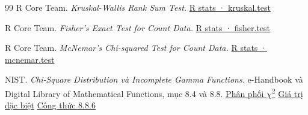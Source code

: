\documentclass[11pt,a4paper]{article}
\begin{document}
\begin{thebibliography}{99}
  R Core Team. \emph{Kruskal-Wallis Rank Sum Test.}
  \href{https://stat.ethz.ch/R-manual/R-devel/library/stats/html/kruskal.test.html}{R stats · kruskal.test}

  R Core Team. \emph{Fisher’s Exact Test for Count Data.}
  \href{https://stat.ethz.ch/R-manual/R-devel/library/stats/html/fisher.test.html}{R stats · fisher.test}

  R Core Team. \emph{McNemar’s Chi-squared Test for Count Data.}
  \href{https://stat.ethz.ch/R-manual/R-devel/library/stats/html/mcnemar.test.html}{R stats · mcnemar.test}

  NIST. \emph{Chi-Square Distribution và Incomplete Gamma Functions.} e-Handbook và Digital Library of Mathematical Functions, mục 8.4 và 8.8.
  \href{https://www.itl.nist.gov/div898/handbook/eda/section3/eda3666.htm}{Phân phối \ensuremath{\chi}\textsuperscript{2}}
  \href{https://dlmf.nist.gov/8.4}{Giá trị đặc biệt}
  \href{https://dlmf.nist.gov/8.8.E6}{Công thức 8.8.6}

\end{thebibliography}
\end{document}
